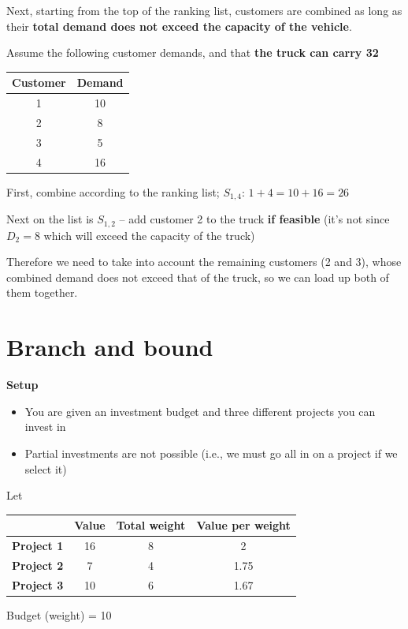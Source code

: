 \documentclass[10pt]{article}
\begin{document}
Next, starting from the top of the ranking list, customers are combined as long as their \textbf{total demand does not exceed the capacity of the vehicle}.

Assume the following customer demands, and that \textbf{the truck can carry 32}
\begin{center}
    \begin{tabular}{|c|c|}
        \hline 
        \textbf{Customer} & \textbf{Demand}\\\hline 
        1 & 10 \\\hline 
        2 & 8 \\\hline 
        3 & 5 \\\hline 
        4 & 16 \\\hline 
    \end{tabular}
\end{center}
First, combine according to the ranking list; $S_{1, 4} $: $1 + 4 = 10 + 16 = 26 $

Next on the list is $S_{1, 2} $ -- add customer 2 to the truck \textbf{if feasible} (it's not since $D_2 = 8 $ which will exceed the capacity of the truck)

Therefore we need to take into account the remaining customers (2 and 3), whose combined demand does not exceed that of the truck, so we can load up both of them together. 
\newpage 
\section{Branch and bound}
\textbf{Setup}
\begin{itemize}
    \item You are given an investment budget and three different projects you can invest in
    \item Partial investments are not possible (i.e., we must go all in on a project if we select it)
\end{itemize}
Let
\begin{center}
    \begin{tabular}{|c|c|c|c|}
        \hline 
        & \textbf{Value} & \textbf{Total weight} & \textbf{Value per weight}\\\hline 
        \textbf{Project 1} & 16 & 8 & 2 \\\hline 
        \textbf{Project 2} & 7 & 4 & 1.75\\\hline 
        \textbf{Project 3} & 10 & 6 & 1.67\\\hline 
    \end{tabular}
\end{center}
Budget (weight) = 10 
\end{document}
